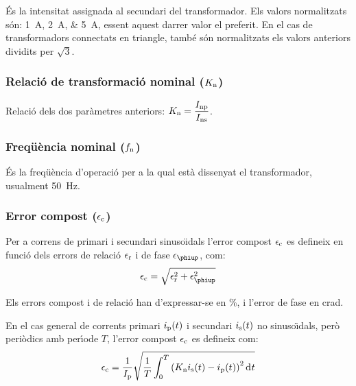  \'{E}s la intensitat assignada al
secundari del transformador. Els valors normalitzats
s\'{o}n: \SIlist{1;2;5}{A}, essent aquest darrer valor el
preferit. En el cas de transformadors connectats en triangle, tamb\'{e} s\'{o}n normalitzats els valors anteriors dividits per $ \sqrt{3}$.

\subsubsection{Relaci\'{o} de transformaci\'{o} nominal ($K_\mathrm{n}$)}

Relaci\'{o} dels dos  par\`{a}metres anteriors: $K_\mathrm{n} = \dfrac{I_\mathrm{np}}{I_\mathrm{ns}}$.

\subsubsection{Freq\"{u}\`{e}ncia nominal ($f_\mathrm{n}$)}

 \'{E}s la freq\"{u}\`{e}ncia d'operaci\'{o} per a la qual    est\`{a} dissenyat el transformador, usualment \SI{50}{Hz}.

\subsubsection{Error compost ($\epsilon_\mathrm{c}$)}

Per a correns de primari i secundari sinuso\"{\i}dals l'error compost $\epsilon_\mathrm{c}$ es defineix  en funci\'{o} dels errors de relaci\'{o} $\epsilon_\mathrm{r}$ i de fase  $\epsilon\ped{\phiup}$, com:
\begin{equation}
    \epsilon\ped{c} = \sqrt{\epsilon\ped{r}^2 +  \epsilon\ped{\phiup}^2}
\end{equation}

Els errors compost i de relaci\'{o} han d'expressar-se en \%, i l'error
de fase en crad.

En el cas general de corrents primari $i_\mathrm{p}(t)$ i secundari $i_\mathrm{s}(t)$ no sinuso\"{\i}dals, per\`{o} peri\`{o}dics amb per\'{\i}ode $T$, l'error compost $\epsilon_\mathrm{c}$ es defineix com:
\begin{equation}
    \epsilon\ped{c} = \frac{1}{I\ped{p}} \sqrt{\frac{1}{T} \int_0^T \left(K\ped{n} i\ped{s}(t) - i\ped{p}(t)\right)^2 \diff t}
\end{equation}

